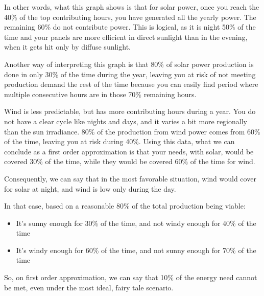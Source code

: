 In other words, what this graph shows is that for solar power, once you reach the 40\% of the top contributing hours, you have generated all the yearly power. The remaining 60\% do not contribute power. This is logical, as it is night 50\% of the time and your panels are more efficient in direct sunlight than in the evening, when it gets hit only by diffuse sunlight.

Another way of interpreting this graph is that 80\% of solar power production is done in only 30\% of the time during the year, leaving you at risk of not meeting production demand the rest of the time because you can easily find period where multiple consecutive hours are in those 70\% remaining hours.

Wind is less predictable, but has more contributing hours during a year. You do not have a clear cycle like nights and days, and it varies a bit more regionally than the sun irradiance. 80\% of the production from wind power comes from 60\% of the time, leaving you at risk during 40\%. Using this data, what we can conclude as a first order approximation is that your needs, with solar, would be covered 30\% of the time, while they would be covered 60\% of the time for wind.

Consequently, we can say that in the most favorable situation, wind would cover for solar at night, and wind is low only during the day.

\begin{remark}
In that case, based on a reasonable 80\% of the total production being viable:

\begin{itemize}
\item It's sunny enough for 30\% of the time, and not windy enough for 40\% of the time
\item It's windy enough for 60\% of the time, and not sunny enough for 70\% of the time
\end{itemize}

So, on first order approximation, we can say that 10\% of the energy need cannot be met, even under the most ideal, fairy tale scenario.

\end{remark}

